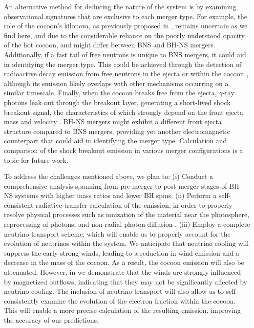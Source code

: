 \documentclass[twocolumn,dvipsnames]{aastex62}
\begin{document}
An alternative method for deducing the nature of the system is by examining observational signatures that are exclusive to each merger type. For example, the role of the cocoon's kilonova, as previously proposed in \citet{Nakar2017,Gottlieb2018a,Gottlieb2020c,Hamidani2022}, remains uncertain as we find here, and due to the considerable reliance on the poorly understood opacity of the hot cocoon, and might differ between BNS and BH-NS mergers. Additionally, if a fast tail of free neutrons is unique to BNS mergers, it could aid in identifying the merger type. This could be achieved through the detection of radioactive decay emission from free neutrons in the ejecta \citep{Metzger2015} or within the cocoon \citep{Gottlieb2020c}, although its emission likely overlaps with other mechanisms occurring on a similar timescale. Finally, when the cocoon breaks free from the ejecta, $ \gamma $-ray photons leak out through the breakout layer, generating a short-lived shock breakout signal, the characteristics of which strongly depend on the front ejecta mass and velocity \citep{Gottlieb2018b}. BH-NS mergers might exhibit a different front ejecta structure compared to BNS mergers, providing yet another electromagnetic counterpart that could aid in identifying the merger type. Calculation and comparison of the shock breakout emission in various merger configurations is a topic for future work.

To address the challenges mentioned above, we plan to:
(i) Conduct a comprehensive analysis spanning from pre-merger to post-merger stages of BH-NS systems with higher mass ratios and lower BH spins.
(ii) Perform a self-consistent radiative transfer calculation of the emission, in order to properly resolve physical processes such as ionization of the material near the photosphere, reprocessing of photons, and non-radial photon diffusion \citep{Darbha2020,Darbha2021}.
(iii) Employ a complete neutrino transport scheme, which will enable us to properly account for the evolution of neutrinos within the system. We anticipate that neutrino cooling will suppress the early strong winds, leading to a reduction in wind emission and a decrease in the mass of the cocoon. As a result, the cocoon emission will also be attenuated. However, in \citet{Gottlieb2023} we demonstrate that the winds are strongly influenced by magnetized outflows, indicating that they may not be significantly affected by neutrino cooling. The inclusion of neutrino transport will also allow us to self-consistently examine the evolution of the electron fraction within the cocoon. This will enable a more precise calculation of the resulting emission, improving the accuracy of our predictions.
                
\end{document}

